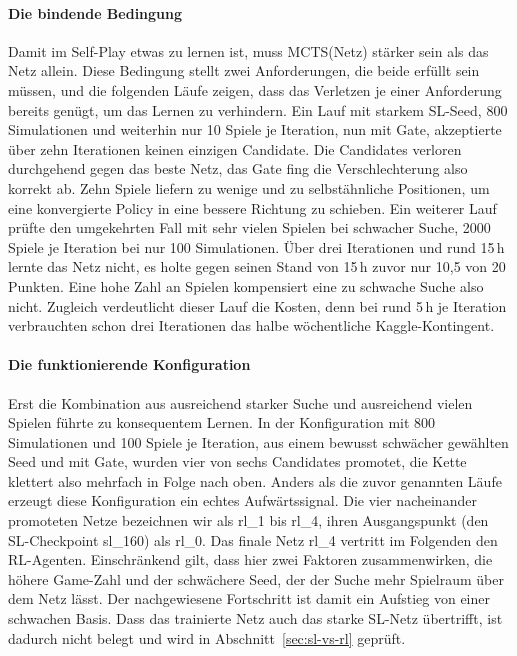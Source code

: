 \documentclass[
  a4paper, 12pt,
  parskip=half,
  headings=small,
  bibliography=totoc
]{scrartcl}
\begin{document}
\paragraph{Die bindende Bedingung}
Damit im Self-Play etwas zu lernen ist, muss MCTS(Netz) stärker sein als das Netz allein. Diese Bedingung stellt zwei Anforderungen, die beide erfüllt sein müssen, und die folgenden Läufe zeigen, dass das Verletzen je einer Anforderung bereits genügt, um das Lernen zu verhindern. Ein Lauf mit starkem SL-Seed, 800 Simulationen und weiterhin nur 10 Spiele je Iteration, nun mit Gate, akzeptierte über zehn Iterationen keinen einzigen Candidate. Die Candidates verloren durchgehend gegen das beste Netz, das Gate fing die Verschlechterung also korrekt ab. 
Zehn Spiele liefern zu wenige und zu selbstähnliche Positionen, um eine konvergierte Policy in eine bessere Richtung zu schieben. 
Ein weiterer Lauf prüfte den umgekehrten Fall mit sehr vielen Spielen bei schwacher Suche, 2000 Spiele je Iteration bei nur 100 Simulationen. Über drei Iterationen und rund 15\,h lernte das Netz nicht, es holte gegen seinen Stand von 15\,h zuvor nur 10{,}5 von 20 Punkten. Eine hohe Zahl an Spielen kompensiert eine zu schwache Suche also nicht. Zugleich verdeutlicht dieser Lauf die Kosten, denn bei rund 5\,h je Iteration verbrauchten schon drei Iterationen das halbe wöchentliche Kaggle-Kontingent.

\paragraph{Die funktionierende Konfiguration}
Erst die Kombination aus ausreichend starker Suche und ausreichend vielen Spielen führte zu konsequentem Lernen. In der Konfiguration mit 800 Simulationen und 100 Spiele je Iteration, aus einem bewusst schwächer gewählten Seed und mit Gate, wurden vier von sechs Candidates promotet, die Kette klettert also mehrfach in Folge nach oben. Anders als die zuvor genannten Läufe erzeugt diese Konfiguration ein echtes Aufwärtssignal.
Die vier nacheinander promoteten Netze bezeichnen wir als rl\_1 bis rl\_4, ihren Ausgangspunkt (den SL-Checkpoint sl\_160) als rl\_0. Das finale Netz rl\_4 vertritt im Folgenden den RL-Agenten.
Einschränkend gilt, dass hier zwei Faktoren zusammenwirken, die höhere Game-Zahl und der schwächere Seed, der der Suche mehr Spielraum über dem Netz lässt. Der nachgewiesene Fortschritt ist damit ein Aufstieg von einer schwachen
Basis. Dass das trainierte Netz auch das starke SL-Netz übertrifft, ist dadurch nicht belegt und wird in Abschnitt~\ref{sec:sl-vs-rl} geprüft.
\end{document}

